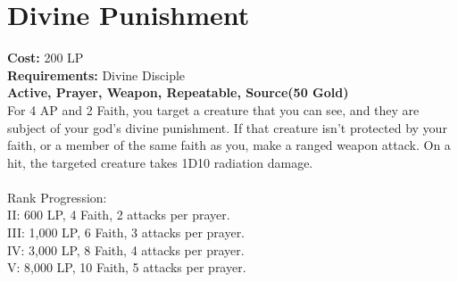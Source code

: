 \section{Divine Punishment}\label{prayer:divinePunishment}
\textbf{Cost:} 200 LP\\
\textbf{Requirements:} Divine Disciple \\
\textbf{Active, Prayer, Weapon, Repeatable, Source(50 Gold)}\\
For 4 AP and 2 Faith, you target a creature that you can see, and they are subject of your god's divine punishment.
If that creature isn't protected by your faith, or a member of the same faith as you, make a ranged weapon attack.
On a hit, the targeted creature takes 1D10 radiation damage.\\
\\
Rank Progression:\\
II: 600 LP, 4 Faith, 2 attacks per prayer.\\
III: 1,000 LP, 6 Faith, 3 attacks per prayer.\\
IV: 3,000 LP, 8 Faith, 4 attacks per prayer.\\
V: 8,000 LP, 10 Faith, 5 attacks per prayer.\\